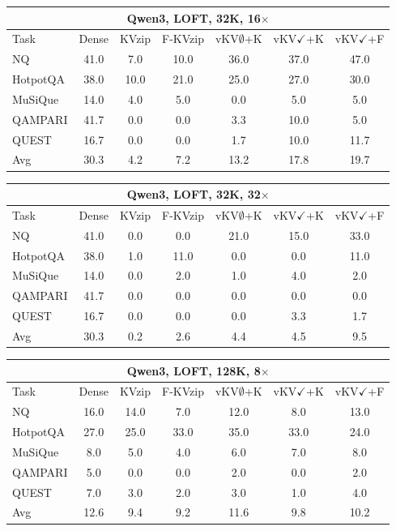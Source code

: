 \begin{tabular}{lcccccc}
\toprule
\multicolumn{7}{c}{Qwen3, LOFT, 32K, 16$\times$} \\
\midrule
Task & Dense & KVzip & F-KVzip & vKV$\emptyset$+K & vKV$\checkmark$+K & vKV$\checkmark$+F \\
\midrule
NQ & 41.0 & 7.0 & 10.0 & 36.0 & 37.0 & 47.0 \\
HotpotQA & 38.0 & 10.0 & 21.0 & 25.0 & 27.0 & 30.0 \\
MuSiQue & 14.0 & 4.0 & 5.0 & 0.0 & 5.0 & 5.0 \\
QAMPARI & 41.7 & 0.0 & 0.0 & 3.3 & 10.0 & 5.0 \\
QUEST & 16.7 & 0.0 & 0.0 & 1.7 & 10.0 & 11.7 \\
\midrule
Avg & 30.3 & 4.2 & 7.2 & 13.2 & 17.8 & 19.7 \\
\bottomrule
\end{tabular}
\vspace{0.8em}

\begin{tabular}{lcccccc}
\toprule
\multicolumn{7}{c}{Qwen3, LOFT, 32K, 32$\times$} \\
\midrule
Task & Dense & KVzip & F-KVzip & vKV$\emptyset$+K & vKV$\checkmark$+K & vKV$\checkmark$+F \\
\midrule
NQ & 41.0 & 0.0 & 0.0 & 21.0 & 15.0 & 33.0 \\
HotpotQA & 38.0 & 1.0 & 11.0 & 0.0 & 0.0 & 11.0 \\
MuSiQue & 14.0 & 0.0 & 2.0 & 1.0 & 4.0 & 2.0 \\
QAMPARI & 41.7 & 0.0 & 0.0 & 0.0 & 0.0 & 0.0 \\
QUEST & 16.7 & 0.0 & 0.0 & 0.0 & 3.3 & 1.7 \\
\midrule
Avg & 30.3 & 0.2 & 2.6 & 4.4 & 4.5 & 9.5 \\
\bottomrule
\end{tabular}
\vspace{0.8em}

\begin{tabular}{lcccccc}
\toprule
\multicolumn{7}{c}{Qwen3, LOFT, 128K, 8$\times$} \\
\midrule
Task & Dense & KVzip & F-KVzip & vKV$\emptyset$+K & vKV$\checkmark$+K & vKV$\checkmark$+F \\
\midrule
NQ & 16.0 & 14.0 & 7.0 & 12.0 & 8.0 & 13.0 \\
HotpotQA & 27.0 & 25.0 & 33.0 & 35.0 & 33.0 & 24.0 \\
MuSiQue & 8.0 & 5.0 & 4.0 & 6.0 & 7.0 & 8.0 \\
QAMPARI & 5.0 & 0.0 & 0.0 & 2.0 & 0.0 & 2.0 \\
QUEST & 7.0 & 3.0 & 2.0 & 3.0 & 1.0 & 4.0 \\
\midrule
Avg & 12.6 & 9.4 & 9.2 & 11.6 & 9.8 & 10.2 \\
\bottomrule
\end{tabular}
\vspace{0.8em}


